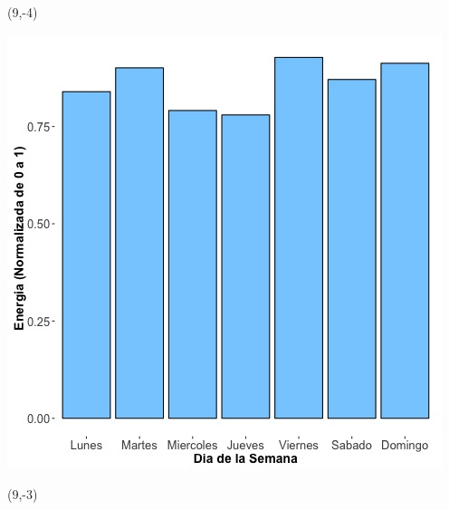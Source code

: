 \documentclass{article}\usepackage[]{graphicx}\usepackage[]{color}
\newenvironment{knitrout}{}{} %
\begin{document}
 \begin{textblock}{1}(9,-4)
\begin{minipage}{20em}
\begingroup

\endgroup
\end{minipage}
\end{textblock}


\begin{knitrout}
\color{fgcolor}
\includegraphics[scale=0.65]{figure/A21_day_of_week_plot} 
\end{knitrout}


 \begin{textblock}{1}(9,-3)
\begin{minipage}{20em}
\begingroup

\endgroup
\end{minipage}
\end{textblock}
\end{document}

